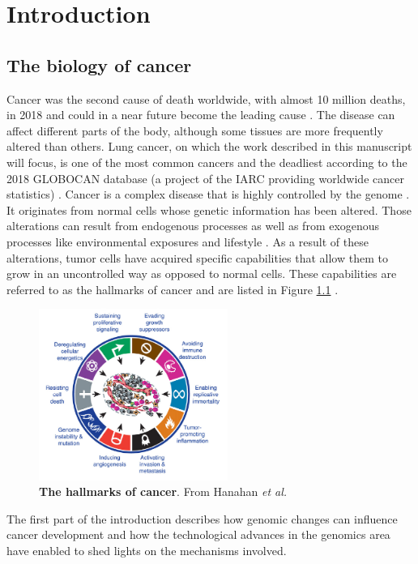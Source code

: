 
\chapter{Introduction} %


\vspace{-1cm}
\section{The biology of cancer}

\label{Intro-biology} 
Cancer was the second cause of death worldwide, with almost 10 million deaths, in 2018 \cite{Bray2018} and could in a near future become the leading cause \cite{Dagenais2020}. The disease can affect different parts of the body, although some tissues are more frequently altered than others.  Lung cancer, on which the work described in this manuscript will focus, is one of the most common cancers and the deadliest according to the 2018 GLOBOCAN database (a project of the \gls{IARC} providing worldwide cancer statistics)  \cite{Bray2018}. Cancer is a complex disease that is highly controlled by the genome \cite{Stratton2009,Wishart2015}. It originates from normal cells whose genetic information has been altered. Those alterations can result from endogenous processes as well as from exogenous processes like environmental exposures and lifestyle \cite{Eggert2011,Luch2005}. As a result of these alterations, tumor cells have acquired specific capabilities that allow them to grow in an uncontrolled way as opposed to normal cells. These capabilities are referred to as the hallmarks of cancer and are listed in Figure \ref{fig:intro_hallmarks} \cite{Hanahan2011}.
\begin{figure}[H]
    \centering
    \includegraphics[width=0.55\textwidth]{Figures/Intro/hallmarks.pdf}
    \caption[The hallmarks of cancer]{\textbf{The hallmarks of cancer}. From Hanahan \textit{et al.} \cite{Hanahan2011}}
    \label{fig:intro_hallmarks}
\end{figure}
The first part of the introduction describes how genomic changes can influence cancer development and how the technological advances in the genomics area have enabled to shed lights on the mechanisms involved. 

